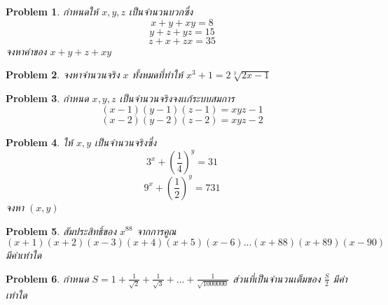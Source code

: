 \documentclass[a4paper,12pt]{article}
\newtheorem{problem}{Problem}
\begin{document}
	\begin{problem}
		กำหนดให้ $x,y,z$ เป็นจำนวนบวกซึ่ง
		$$ x+y+xy=8$$
		$$ y+z+yz=15$$
		$$z+x+zx=35 $$
		จงหาค่าของ $x+y+z+xy$
	\end{problem}


	
	
	

	\begin{problem}
		จงหาจำนวนจริง $x$ ทั้งหมดที่ทำให้ $x^3+1=2\sqrt[3]{2x-1}$
	\end{problem}
		\begin{problem}
		กำหนด $x,y,z$ เป็นจำนวนจริงจงเเก้ระบบสมการ
		$$(x-1)(y-1)(z-1)=xyz-1$$
		$$(x-2)(y-2)(z-2)=xyz-2$$
	\end{problem}
	\begin{problem}
		ให้ $x,y$ เป็นจำนวนจริงซึ่ง
		$$3^x+(\frac{1}{4})^y=31$$
		$$9^x+(\frac{1}{2})^y=731$$
		จงหา $(x,y)$
	\end{problem}

	

	\begin{problem}
		สัมประสิทธิ์ของ $x^{88}$ จากการคูณ
		$$(x+1)(x+2)(x-3)(x+4)(x+5)(x-6)...(x+88)(x+89)(x-90)$$ มีค่าเท่าใด
	\end{problem}
	\begin{problem}
		กำหนด $S=1+\frac{1}{\sqrt{2}}+\frac{1}{\sqrt{3}}+...+\frac{1}{\sqrt{1000000}}$ ส่วนที่เป็นจำนวนเต็มของ $\frac{S}{2}$ มีค่าเท่าใด
	\end{problem}
\end{document}
